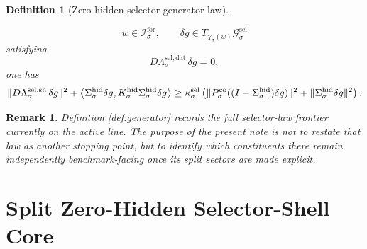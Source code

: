 \documentclass[11pt]{article}
\newcommand{\ForSpace}[1]{\mathcal I_{#1}^{\mathrm{for}}}
\newcommand{\GenSpace}[1]{\mathcal G_{#1}^{\mathrm{sel}}}
\newcommand{\GenData}[1]{\Lambda_{#1}^{\mathrm{sel,dat}}}
\newcommand{\GenShell}[1]{\Lambda_{#1}^{\mathrm{sel,sh}}}
\newcommand{\HiddenSel}[1]{\Sigma_{#1}^{\mathrm{hid}}}
\newcommand{\HiddenOperator}[1]{K_{#1}^{\mathrm{hid}}}
\newcommand{\GenEmbed}[1]{\chi_{#1}}
\newcommand{\StateComp}[1]{P_{#1}^{\mathrm{co}}}
\newtheorem{definition}{Definition}
\newtheorem{remark}{Remark}
\begin{document}
\begin{definition}[Zero-hidden selector generator law]
\begin{enumerate}
    \[
    w\in\ForSpace{\sigma},
    \qquad
    \delta g\in T_{\GenEmbed{\sigma}(w)}\GenSpace{\sigma}
    \]
    satisfying
    \[
    D\GenData{\sigma}\,\delta g=0,
    \]
    one has
    \begin{equation}
    \|D\GenShell{\sigma}\,\delta g\|^{2}
    +
    \ev{
    \HiddenSel{\sigma}\delta g,
    \HiddenOperator{\sigma}\HiddenSel{\sigma}\delta g
    }
    \ge
    \kappa_{\sigma}^{\mathrm{sel}}
    \left(
    \|\StateComp{\sigma}( (I-\HiddenSel{\sigma})\delta g )\|^{2}
    +
    \|\HiddenSel{\sigma}\delta g\|^{2}
    \right).
    \label{eq:gencoercive}
    \end{equation}
\end{enumerate}
\end{definition}

\begin{remark}
Definition \ref{def:generator} records the full selector-law frontier currently on the active line. The purpose of the present note is not to restate that law as another stopping point, but to identify which constituents there remain independently benchmark-facing once its split sectors are made explicit.
\end{remark}

\section{Split Zero-Hidden Selector-Shell Core}
\end{document}
